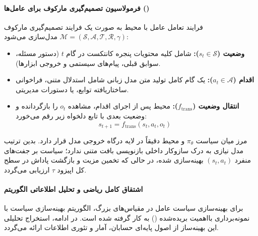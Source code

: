 \paragraph*{فرمولاسیون تصمیم‌گیری مارکوف برای عامل‌ها ()}
فرایند تعامل عامل با محیط به صورت یک فرایند تصمیم‌گیری مارکوف $\mathcal{M} = (\mathcal{S}, \mathcal{A}, \mathcal{T}, \mathcal{R}, \gamma)$ مدل‌سازی می‌شود:
\begin{itemize}
    \item \textbf{وضعیت ($s_t \in \mathcal{S}$):} شامل کلیه محتویات پنجره کانتکست در گام $t$ (دستور مسئله، سوابق قبلی، پیام‌های سیستمی و خروجی ابزارها).
    \item \textbf{اقدام ($a_t \in \mathcal{A}$):} یک گام کامل تولید متن مدل زبانی شامل استدلال متنی، فراخوانی ساختاریافته توابع، یا دستورات مدیریتی.
    \item \textbf{انتقال وضعیت ($f_{\text{trans}}$):} محیط پس از اجرای اقدام، مشاهده $o_t$ را بازگردانده و وضعیت بعدی با تابع دلخواه زیر رقم می‌خورد:
    \begin{equation}
        s_{t+1} = f_{\text{trans}}(s_t, a_t, o_t)
    \end{equation}
\end{itemize}
مرز میان سیاست $\pi_\theta$ و محیط دقیقاً در لایه درگاه خروجی مدل قرار دارد. بدین ترتیب مدل نیازی به درک سازوکار داخلی بازنویسی بافت متنی ندارد؛ سیاست بر جفت‌های منفرد $(s_t, a_t)$ بهینه‌سازی شده، در حالی که تخمین مزیت و بازگشت پاداش در سطح کل اپیزود $\tau$ ارزیابی می‌گردد.

\paragraph*{اشتقاق کامل ریاضی و تحلیل اطلاعاتی الگوریتم }
برای بهینه‌سازی سیاست عامل در مقیاس‌های بزرگ، الگوریتم بهینه‌سازی سیاست با نمونه‌برداری بااهمیت بریده‌شده () \cite{minimax2025m1} به کار گرفته شده است. در ادامه، استخراج تحلیلی این بهینه‌ساز از اصول پایه‌ای حسابان، آمار و تئوری اطلاعات ارائه می‌گردد.

